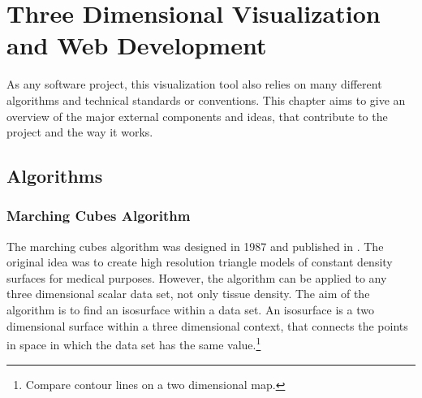 \chapter{Three Dimensional Visualization and Web Development}

As any software project, this visualization tool also relies on many different algorithms and technical standards or conventions. This chapter aims to give an overview of the major external components and ideas, that contribute to the project and the way it works.
\section{Algorithms}
\subsection{Marching Cubes Algorithm}
The marching cubes algorithm was designed in 1987 and published in \cite{MarchCubes}. The original idea was to create high resolution triangle models of constant density surfaces for medical purposes. However, the algorithm can be applied to any three dimensional scalar data set, not only tissue density. The aim of the algorithm is to find an isosurface within a data set. An isosurface is a two dimensional surface within a three dimensional context, that connects the points in space in which the data set has the same value.\footnote{Compare contour lines on a two dimensional map.}

